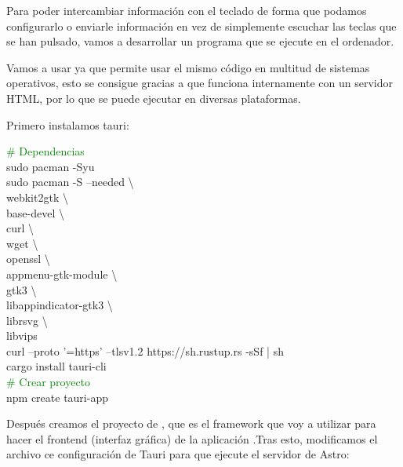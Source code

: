 Para poder intercambiar información con el teclado de forma que podamos configurarlo o enviarle información en vez de simplemente escuchar las teclas que se han pulsado, vamos a desarrollar un programa que se ejecute en el ordenador. 

Vamos a usar  ya que permite usar el mismo código en multitud de sistemas operativos, esto se consigue gracias a que funciona internamente con un servidor HTML, por lo que se puede ejecutar en diversas plataformas.

Primero instalamos tauri: \newline
\begin{multicli}
    \textcolor{green}{\# Dependencias} \\
    \cliarrow sudo pacman -Syu \\
    \cliarrow sudo pacman -S --needed \textbackslash \\
    \mytab webkit2gtk \textbackslash \\
    \mytab base-devel \textbackslash \\
    \mytab curl \textbackslash \\
    \mytab wget \textbackslash \\
    \mytab openssl \textbackslash \\
    \mytab appmenu-gtk-module  \textbackslash \\
    \mytab gtk3 \textbackslash \\
    \mytab libappindicator-gtk3 \textbackslash \\
    \mytab librsvg \textbackslash \\
    \mytab libvips \\
    \cliarrow curl --proto '=https' --tlsv1.2 https://sh.rustup.rs -sSf | sh \\
    \cliarrow cargo install tauri-cli \\

    \textcolor{green}{\# Crear proyecto} \\
    \cliarrow npm create tauri-app
\end{multicli}

Después creamos el proyecto de , que es el framework que voy a utilizar para hacer el frontend (interfaz gráfica) de la aplicación .Tras esto, modificamos el archivo ce configuración de Tauri para que ejecute el servidor de Astro: \vspace{1cm} \newline
{}

